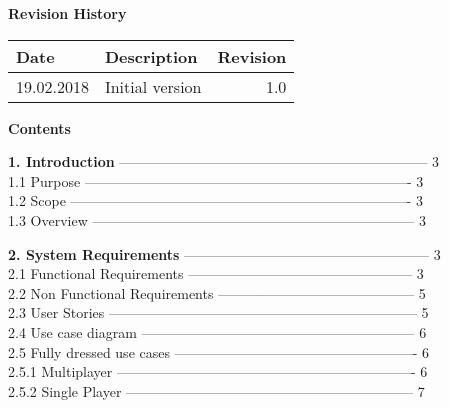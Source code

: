 \documentclass{article}
\begin{document}
	\begin{flushleft}
\textbf{Revision History}\\
\begin{tabular}{|l|l|r|}
	\hline
	Date\hspace{2cm} & Description\hspace{5cm} & Revision \\
	\hline
	19.02.2018 & Initial version & 1.0 \\
	\hline

	\end{tabular}
\newpage

\begin{Large}\textbf{Contents}\\
\end{Large}
\vspace{5mm}
\textbf{1.	Introduction}  ------------------------------------------------------------------  	 3\\
1.1	\hspace{0.5cm}Purpose  ----------------------------------------------------------------------	 3\\
1.2	\hspace{0.5cm}Scope  -------------------------------------------------------------------------	 3\\
1.3	\hspace{0.5cm}Overview  ---------------------------------------------------------------------	 3\\
\vspace{3mm}

\textbf{2.	System Requirements}  -----------------------------------------------------	 3   \\
2.1	\hspace{0.5cm}Functional Requirements  ------------------------------------------------	 3\\
2.2	\hspace{0.5cm}Non Functional Requirements  ------------------------------------------	 5\\
2.3	\hspace{0.5cm}User Stories  ------------------------------------------------------------------   5\\
2.4	\hspace{0.5cm}Use case diagram  -----------------------------------------------------------	 6\\
2.5	\hspace{0.5cm}Fully dressed use cases  ----------------------------------------------------	6\\
\hspace{0.5cm}2.5.1	Multiplayer  ----------------------------------------------------------------	6\\
\hspace{0.5cm}2.5.2	Single Player  --------------------------------------------------------------	7\\
\vspace{3mm}



\end{flushleft}
\end{document}
